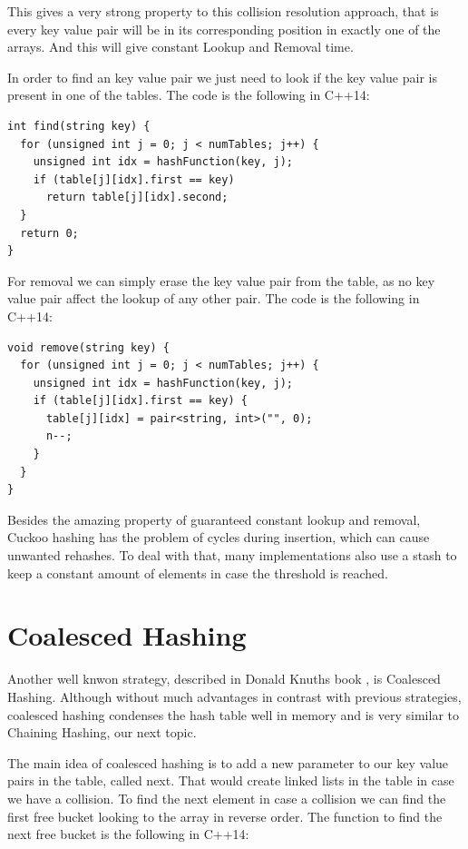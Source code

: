 This gives a very strong property to this collision resolution approach, that is every key value pair will be in its corresponding position in exactly one of the arrays. And this will give constant Lookup and Removal time. 

In order to find an key value pair we just need to look if the key value pair is present in one of the tables. The code is the following in C++14:

\begin{lstlisting}
int find(string key) {
  for (unsigned int j = 0; j < numTables; j++) {
    unsigned int idx = hashFunction(key, j);
    if (table[j][idx].first == key)
      return table[j][idx].second;
  }
  return 0;
}
\end{lstlisting}

For removal we can simply erase the key value pair from the table, as no key value pair affect the lookup of any other pair. The code is the following in C++14:

\begin{lstlisting}
void remove(string key) {
  for (unsigned int j = 0; j < numTables; j++) {
    unsigned int idx = hashFunction(key, j);
    if (table[j][idx].first == key) {
      table[j][idx] = pair<string, int>("", 0);
      n--;
    }
  }
}
\end{lstlisting}

Besides the amazing property of guaranteed constant lookup and removal, Cuckoo hashing has the problem of cycles during insertion, which can cause unwanted rehashes. To deal with that, many implementations also use a stash to keep a constant amount of elements in case the threshold is reached.

\section{Coalesced Hashing}

Another well knwon strategy, described in Donald Knuths book \citep{TAOCP3}, is Coalesced Hashing. Although without much advantages in contrast with previous strategies, coalesced hashing condenses the hash table well in memory and is very similar to Chaining Hashing, our next topic.

The main idea of coalesced hashing is to add a new parameter to our key value pairs in the table, called next. That would create linked lists in the table in case we have a collision. To find the next element in case a collision we can find the first free bucket looking to the array in reverse order. The function to find the next free bucket is the following in C++14:

